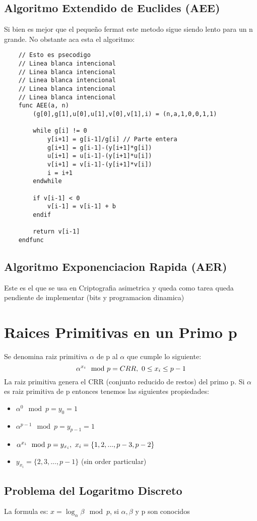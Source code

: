 \documentclass{article}
\begin{document}
\subsection{Algoritmo Extendido de Euclides (AEE)}
Si bien es mejor que el pequeño fermat este metodo sigue siendo lento para un n grande. No
obstante aca esta el algoritmo:

\begin{verbatim}
    // Esto es psecodigo
    // Linea blanca intencional
    // Linea blanca intencional
    // Linea blanca intencional
    // Linea blanca intencional
    // Linea blanca intencional
    func AEE(a, n)
        (g[0],g[1],u[0],u[1],v[0],v[1],i) = (n,a,1,0,0,1,1)

        while g[i] != 0
            y[i+1] = g[i-1]/g[i] // Parte entera
            g[i+1] = g[i-1]-(y[i+1]*g[i])
            u[i+1] = u[i-1]-(y[i+1]*u[i])
            v[i+1] = v[i-1]-(y[i+1]*v[i])
            i = i+1
        endwhile

        if v[i-1] < 0
            v[i-1] = v[i-1] + b
        endif

        return v[i-1]
    endfunc
\end{verbatim}

\subsection{Algoritmo Exponenciacion Rapida (AER)}
Este es el que se usa en Criptografia asimetrica y queda como tarea queda pendiente de
implementar (bits y programacion dinamica)


\section{Raices Primitivas en un Primo p}
Se denomina raiz primitiva $\alpha$ de p al $\alpha$ que cumple lo siguiente:
$$
    \alpha^{x_{i}} \mod p = CRR, \,\, 0 \leq x_{i} \leq p-1
$$
La raiz primitiva genera el CRR (conjunto reducido de restos) del primo p. Si $\alpha$ es
raiz primitiva de p entonces tenemos las siguientes propiedades:
\begin{itemize}
    \item $\alpha^{0} \mod p = y_{0} = 1$
    \item $\alpha^{p-1} \mod p = y_{p-1} = 1$
    \item $\alpha^{x_{i}} \mod p = y_{x_{i}}, \,\, x_{i} = \{1,2,...,p-3,p-2\}$
    \item $y_{x_{i}} = \{2,3,...,p-1\}$ (sin order particular)
\end{itemize}

\subsection{Problema del Logaritmo Discreto}
La formula es: $x = \log_{\alpha} \beta \mod p$, si $\alpha, \beta$ y p son conocidos
\end{document}
